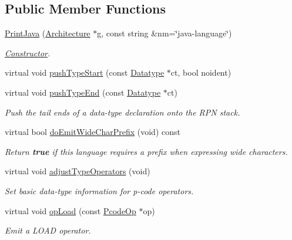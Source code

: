\subsection*{Public Member Functions}
\begin{DoxyCompactItemize}
\item 
\mbox{\hyperlink{class_print_java_adb73af82f5926d43f6f8ac928b807229}{Print\+Java}} (\mbox{\hyperlink{class_architecture}{Architecture}} $\ast$g, const string \&nm=\char`\"{}java-\/language\char`\"{})
\begin{DoxyCompactList}\small\item\em \mbox{\hyperlink{class_constructor}{Constructor}}. \end{DoxyCompactList}\item 
virtual void \mbox{\hyperlink{class_print_java_af82e5ca143891ea052778b1ed234d3e0}{push\+Type\+Start}} (const \mbox{\hyperlink{class_datatype}{Datatype}} $\ast$ct, bool noident)
\item 
virtual void \mbox{\hyperlink{class_print_java_a64718e3b689e9e895f4c6124f8538075}{push\+Type\+End}} (const \mbox{\hyperlink{class_datatype}{Datatype}} $\ast$ct)
\begin{DoxyCompactList}\small\item\em Push the tail ends of a data-\/type declaration onto the R\+PN stack. \end{DoxyCompactList}\item 
virtual bool \mbox{\hyperlink{class_print_java_a4f4aba29ed21a74bafe52eb5cc3fe904}{do\+Emit\+Wide\+Char\+Prefix}} (void) const
\begin{DoxyCompactList}\small\item\em Return {\bfseries{true}} if this language requires a prefix when expressing {\itshape wide} characters. \end{DoxyCompactList}\item 
virtual void \mbox{\hyperlink{class_print_java_afcad564cec849b9f7d5ce1eaeb396c7d}{adjust\+Type\+Operators}} (void)
\begin{DoxyCompactList}\small\item\em Set basic data-\/type information for p-\/code operators. \end{DoxyCompactList}\item 
virtual void \mbox{\hyperlink{class_print_java_afd7d6ab9dfeae02ed5a32eb0e0b9aec3}{op\+Load}} (const \mbox{\hyperlink{class_pcode_op}{Pcode\+Op}} $\ast$op)
\begin{DoxyCompactList}\small\item\em Emit a L\+O\+AD operator. \end{DoxyCompactList}\item 

\end{DoxyCompactItemize}
